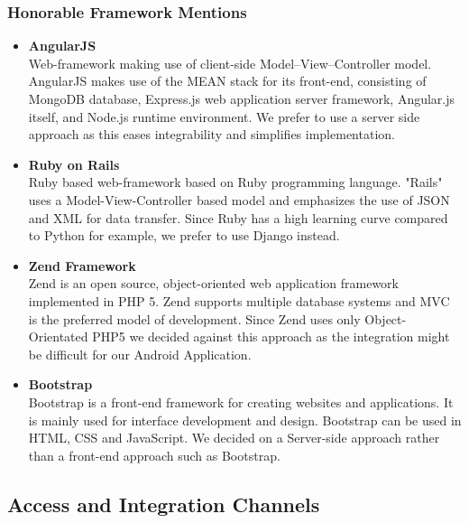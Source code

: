 \documentclass{article}
\begin{document}
	\subsubsection{Honorable Framework Mentions}
	\begin{itemize}
	
	
	\item\textbf{AngularJS}\label{subsubsec: AngularJS} \\
	Web-framework making use of client-side Model–View–Controller model. 
		AngularJS makes use of the MEAN stack for its front-end, consisting of MongoDB database, Express.js web application server framework, Angular.js itself, and Node.js runtime environment.
		We prefer to use a server side approach as this eases integrability and simplifies implementation.
	\item\textbf{Ruby on Rails}\label{subsubsec: Rails} \\
		Ruby based web-framework based on Ruby programming language. "Rails" uses a Model-View-Controller based model and emphasizes the use of JSON and XML for data transfer.
		Since Ruby has a high learning curve compared to Python for example, we prefer to use Django instead.
	\item\textbf{Zend Framework}\label{subsubsec: Zend}\\
	 Zend is an open source, object-oriented web application framework implemented in PHP 5. Zend supports multiple database systems and MVC is the preferred model of development.
	 Since Zend uses only Object-Orientated PHP5 we decided against this approach as the integration might be difficult for our Android Application.
	 \item\textbf{Bootstrap}\label{subsubsec: Bootstrap}\\
	 Bootstrap is a front-end framework for creating websites and applications. It is mainly used for interface development and design. Bootstrap can be used in HTML, CSS and JavaScript. 
	 We decided on a Server-side approach rather than a front-end approach such as Bootstrap.
	\end{itemize}
	
	\subsection{Access and Integration Channels}
\end{document}

